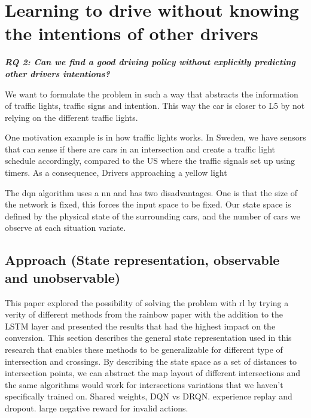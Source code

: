 \chapter{Learning to drive without knowing the intentions of other drivers}
\begin{center}
\textit{\textbf{RQ 2: Can we find a good driving policy without explicitly predicting other drivers intentions?}}
\end{center}
\vspace{12pt}
We want to formulate the problem in such a way that abstracts the information of traffic lights, traffic signs and intention. This way the car is closer to L5 by not relying on the different traffic lights.

One motivation example is in how traffic lights works. In Sweden, we have sensors that can sense if there are cars in an intersection and create a traffic light schedule accordingly, compared to the US where the traffic signals set up using timers. As a consequence, Drivers approaching a yellow light 

The \gls{dqn} algorithm uses a \gls{nn} and has two disadvantages. One is that the size of the network is fixed, this forces the input space to be fixed. Our state space is defined by the physical state of the surrounding cars, and the number of cars we observe at each situation variate. %

\section{Approach (State representation, observable and unobservable)}
This paper explored the possibility of solving the problem with \gls{rl} by trying a verity of different methods from the rainbow paper with the addition to the LSTM layer and presented the results that had the highest impact on the conversion. 
This section describes the general state representation used in this research that enables these methods to be generalizable for different type of intersection and crossings. 
By describing the state space as a set of distances to intersection points, we can abstract the map layout of different intersections and the same algorithms would work for intersections variations that we haven't specifically trained on. 
Shared weights, DQN vs DRQN. 
experience replay and dropout. 
large negative reward for invalid actions.
